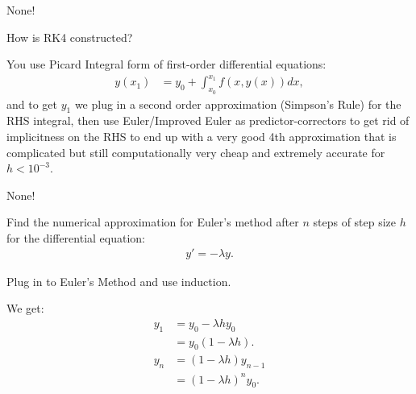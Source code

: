 \documentclass[11pt]{article}
\begin{document}
        \begin{remark}[Footnotes.]
            None!
        \end{remark}
    \newpage \setcounter{equation}{-1} \begin{problem} [Problem 5c]
        How is RK4 constructed?
    \end{problem}
        \begin{solution}[Answer 5c]
            You use Picard Integral form of first-order differential equations:
            \begin{align}
                y(x_1) &= y_0 + \int_{x_0}^{x_1} f(x,y(x)) dx,
            \end{align}
            and to get $y_1$ we plug in a second order approximation (Simpson's Rule) for the RHS integral, then use Euler/Improved Euler
            as predictor-correctors to get rid of implicitness on the RHS to end up with a very good 4th approximation that is complicated but still computationally 
            very cheap and extremely accurate for $h < 10^{-3}$.
        \end{solution}
        \begin{remark}[Footnotes.]
            None!
        \end{remark}
    \newpage \setcounter{equation}{-1} \begin{problem} [Problem 6a]
        Find the numerical approximation for Euler's method after $n$ steps of step size $h$ for the differential equation:
        \begin{align}
            y' = - \lambda y.
        \end{align}
    \end{problem}
        \begin{remark}[Method.]
            Plug in to Euler's Method and use induction.
        \end{remark}
        \begin{solution}[Solution 6a]
            We get:
            \begin{align}
                y_1 &= y_0 -\lambda hy_0 \\
                &= y_0(1-\lambda h).\\
                y_n &= (1-\lambda h)y_{n-1} \\
                &= (1-\lambda h)^ny_0.
            \end{align}
        \end{solution}
\end{document}
